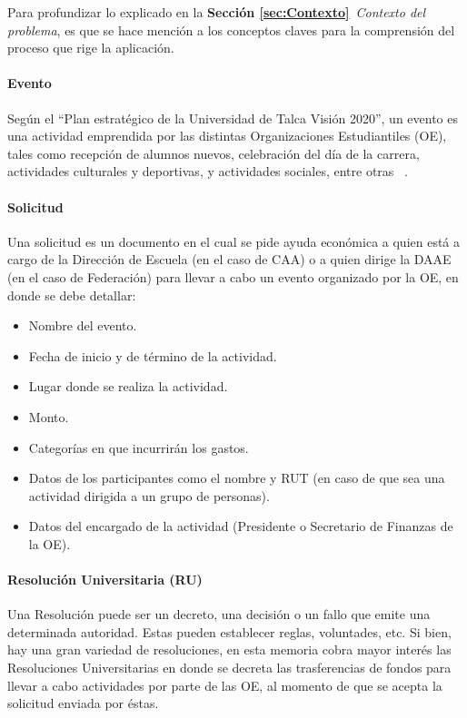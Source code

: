 Para profundizar lo explicado en la \textbf{Sección \ref{sec:Contexto}}~\emph{Contexto del problema}, es que se hace mención a los conceptos claves para la comprensión del proceso que rige la aplicación.

\paragraph{Evento}

  Según el ``Plan estratégico de la Universidad de Talca Visión 2020'', un evento es una actividad emprendida por las distintas Organizaciones Estudiantiles (OE), tales como recepción de alumnos nuevos, celebración del día de la carrera, actividades culturales y deportivas, y actividades sociales, entre otras ~\cite{5}. 

\paragraph{Solicitud}

  Una solicitud es un documento en el cual se pide ayuda económica a quien está a cargo de la Dirección de Escuela (en el caso de CAA) o a quien dirige la DAAE (en el caso de Federación) para llevar a cabo un evento organizado por la OE, en donde se debe detallar:

  \begin{itemize}
      \item Nombre del evento.
      \item Fecha de inicio y de término de la actividad.
      \item Lugar donde se realiza la actividad. 
      \item Monto. 
      \item Categorías en que incurrirán los gastos.
      \item Datos de los participantes como el nombre y RUT (en caso de que sea una actividad dirigida a un grupo de personas). 
      \item Datos del encargado de la actividad (Presidente o Secretario de Finanzas de la OE).
  \end{itemize}

\paragraph{Resolución Universitaria (RU)}

  Una Resolución puede ser un decreto, una decisión o un fallo que emite una determinada autoridad. Estas pueden establecer reglas, voluntades, etc. Si bien, hay una gran variedad de resoluciones, en esta memoria cobra mayor interés las Resoluciones Universitarias en donde se decreta las trasferencias de fondos para llevar a cabo actividades por parte de las OE, al momento de que se acepta la solicitud enviada por éstas.

